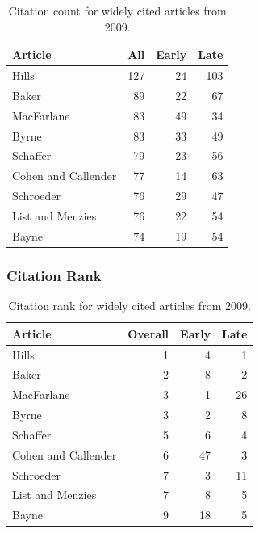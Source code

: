\documentclass[
  10pt,
  letterpaper,
  DIV=11,
  numbers=noendperiod,
  twoside]{scrartcl}
\begin{document}
\begin{longtable}[]{@{}lrrr@{}}

\caption{\label{tbl-citation-count-2009}Citation count for widely cited
articles from 2009.}

\tabularnewline

\toprule\noalign{}
Article & All & Early & Late \\
\midrule\noalign{}
\endhead
\bottomrule\noalign{}
\endlastfoot
Hills & 127 & 24 & 103 \\
Baker & 89 & 22 & 67 \\
MacFarlane & 83 & 49 & 34 \\
Byrne & 83 & 33 & 49 \\
Schaffer & 79 & 23 & 56 \\
Cohen and Callender & 77 & 14 & 63 \\
Schroeder & 76 & 29 & 47 \\
List and Menzies & 76 & 22 & 54 \\
Bayne & 74 & 19 & 54 \\

\end{longtable}

\subsubsection*{Citation Rank}\label{sec-rank-2009}

\begin{longtable}[]{@{}lrrr@{}}

\caption{\label{tbl-citation-rank-2009}Citation rank for widely cited
articles from 2009.}

\tabularnewline

\toprule\noalign{}
Article & Overall & Early & Late \\
\midrule\noalign{}
\endhead
\bottomrule\noalign{}
\endlastfoot
Hills & 1 & 4 & 1 \\
Baker & 2 & 8 & 2 \\
MacFarlane & 3 & 1 & 26 \\
Byrne & 3 & 2 & 8 \\
Schaffer & 5 & 6 & 4 \\
Cohen and Callender & 6 & 47 & 3 \\
Schroeder & 7 & 3 & 11 \\
List and Menzies & 7 & 8 & 5 \\
Bayne & 9 & 18 & 5 \\

\end{longtable}
\end{document}
